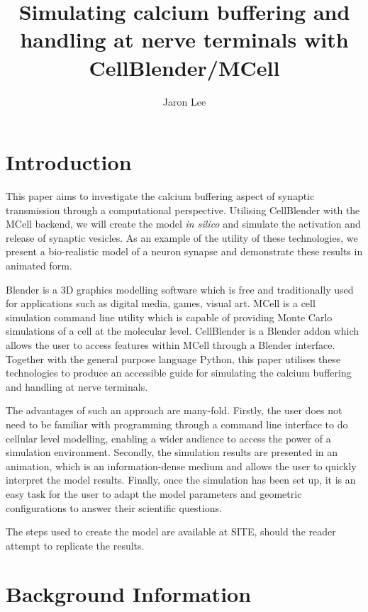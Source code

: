 \documentclass[a4paper]{article}
\title{Simulating calcium buffering and handling at nerve terminals with CellBlender/MCell}
\author{Jaron Lee}
\begin{document}
\maketitle

\section{Introduction}
This paper aims to investigate the calcium buffering aspect of synaptic transmission through a computational perspective. Utilising CellBlender with the MCell backend, we will create the model \textit{in silico} and simulate the activation and release of synaptic vesicles. As an example of the utility of these technologies, we present a bio-realistic model of a neuron synapse and demonstrate these results in animated form.

Blender is a 3D graphics modelling software which is free and traditionally used for applications such as digital media, games, visual art. MCell is a cell simulation command line utility which is capable of providing Monte Carlo simulations of a cell at the molecular level. CellBlender is a Blender addon which allows the user to access features within MCell through a Blender interface. Together with the general purpose language Python, this paper utilises these technologies to produce an accessible guide for simulating the calcium buffering and handling at nerve terminals.

The advantages of such an approach are many-fold. Firstly, the user does not need to be familiar with programming through a command line interface to do cellular level modelling, enabling a wider audience to access the power of a simulation environment. Secondly, the simulation results are presented in an animation, which is an information-dense medium and allows the user to quickly interpret the model results.
Finally, once the simulation has been set up, it is an easy task for the user to adapt the model parameters and geometric configurations to answer their scientific questions. 

The steps used to create the model are available at SITE, should the reader attempt to replicate the results.

\section{Background Information}
\end{document}
